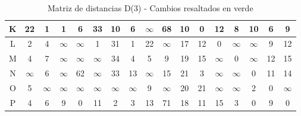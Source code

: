 \documentclass[12pt]{article}
\begin{document}
\begin{table}[h!]
\begin{tabular}{|c|c|c|c|c|c|c|c|c|c|c|c|c|c|c|c|c|}
K & 22 & 1 & 1 & \cellcolor{lightgreen} 6 & 33 & \cellcolor{lightgreen} 10 & \cellcolor{lightgreen} 6 & $\infty$ & \cellcolor{lightgreen} 68 & \cellcolor{lightgreen} 10 & 0 & 12 & \cellcolor{lightgreen} 8 & \cellcolor{lightgreen} 10 & 6 & 9 \\\hline
L & 2 & 4 & $\infty$ & $\infty$ & 1 & 31 & 1 & 22 & $\infty$ & 17 & 12 & 0 & $\infty$ & $\infty$ & 9 & 12 \\\hline
M & 4 & 7 & $\infty$ & $\infty$ & $\infty$ & 34 & 4 & 5 & 9 & 19 & 15 & $\infty$ & 0 & $\infty$ & 12 & 15 \\\hline
N & $\infty$ & 6 & $\infty$ & 62 & $\infty$ & 33 & 13 & $\infty$ & 15 & 21 & 3 & $\infty$ & $\infty$ & 0 & 11 & 14 \\\hline
O & 5 & $\infty$ & $\infty$ & $\infty$ & $\infty$ & $\infty$ & $\infty$ & 9 & $\infty$ & 20 & 21 & $\infty$ & $\infty$ & 2 & 0 & $\infty$ \\\hline
P & 4 & 6 & 9 & 0 & 11 & 2 & 3 & 13 & 71 & \cellcolor{lightgreen} 18 & 11 & 15 & 3 & 0 & 9 & 0 \\\hline
\end{tabular}
\caption{Matriz de distancias D(3) - Cambios resaltados en verde}
\end{table}
\end{document}
